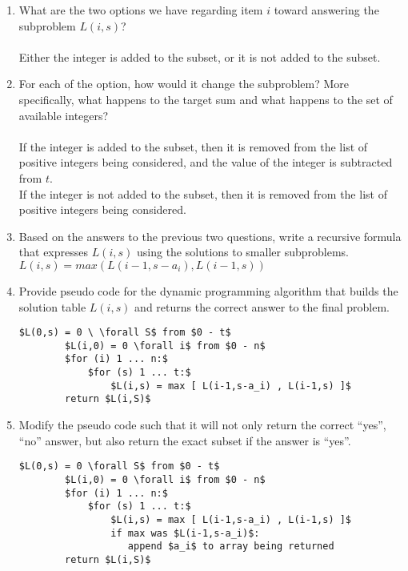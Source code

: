 \documentclass[12pt]{article}
\begin{document}
\begin{enumerate}
    \item What are the two options we have regarding item $i$ toward answering the subproblem $L(i, s)$? \\\\
        Either the integer is added to the subset, or it is not added to the subset. 

    \item For each of the option, how would it change the subproblem? More
    specifically, what happens to the target sum and what happens to the set
    of available integers? \\\\
        If the integer is added to the subset, then it is removed from the list of positive integers being considered, and the value of the integer is subtracted from $t$.\\
        If the integer is not added to the subset, then it is removed from the list of positive integers being considered. 

    \item Based on the answers to the previous two questions, write a
    recursive formula that expresses $L(i, s)$ using the solutions to smaller
    subproblems.  \\
        $L(i, s) = max( L(i-1, s-a_i) , L(i-1, s) )$

    \item Provide pseudo code for the dynamic programming algorithm that
    builds the solution table $L(i, s)$ and returns the correct answer to
    the final problem.

    \begin{lstlisting}[mathescape]
        $L(0,s) = 0 \ \forall S$ from $0 - t$
        $L(i,0) = 0 \forall i$ from $0 - n$
        $for (i) 1 ... n:$
            $for (s) 1 ... t:$
                $L(i,s) = max [ L(i-1,s-a_i) , L(i-1,s) ]$
        return $L(i,S)$
    \end{lstlisting}
        
    \item Modify the pseudo code such that it will not only return the
    correct “yes”, “no” answer, but also return the exact subset if the
    answer is “yes”. \\

    \begin{lstlisting}[mathescape]
        $L(0,s) = 0 \forall S$ from $0 - t$
        $L(i,0) = 0 \forall i$ from $0 - n$
        $for (i) 1 ... n:$
            $for (s) 1 ... t:$
                $L(i,s) = max [ L(i-1,s-a_i) , L(i-1,s) ]$
                if max was $L(i-1,s-a_i)$:
                   append $a_i$ to array being returned
        return $L(i,S)$
    \end{lstlisting}

\end{enumerate}
\end{document}
